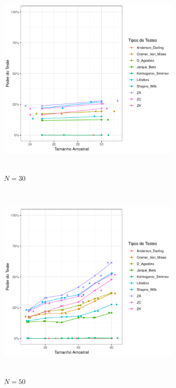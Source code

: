 \documentclass[final]{beamer}
\begin{document}
\begin{frame}[t]
\begin{columns}[t,totalwidth=0.6\paperwidth]
\begin{column}{0.45\textwidth}
\begin{figure}[H]
    \begin{subfigure}[b]{0.32\textwidth}
        \centering
        \includegraphics[height=10cm,keepaspectratio]{Distribuição_Beta/Poder_Teste/poder_teste_beta_30.pdf}
        \caption{\(N = 30\)}
    \end{subfigure}
    \hfill
    \begin{subfigure}[b]{0.32\textwidth}
        \centering
        \includegraphics[height=10cm,keepaspectratio]{Distribuição_Beta/Poder_Teste/poder_teste_beta_50.pdf}
        \caption{\(N = 50\)}
    \end{subfigure}
    \hfill
    \begin{subfigure}[b]{0.32\textwidth}
        \centering

\end{subfigure}
\end{figure}
\end{column}
\end{columns}
\end{frame}
\end{document}
